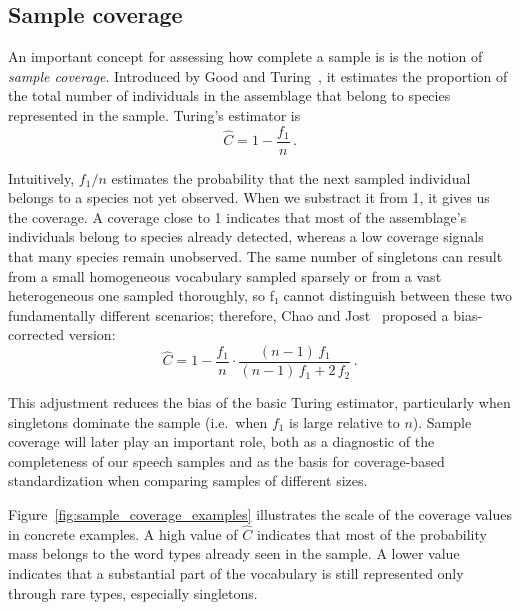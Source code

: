 ﻿\documentclass{article}
\begin{document}
\subsection{Sample coverage}\label{subsec:coverage}
 
An important concept for assessing how complete a sample is is the notion of \emph{sample coverage}. Introduced by Good and Turing~\cite{good1953}, it estimates the proportion of the total number of individuals in the assemblage that belong to species represented in the sample. Turing's estimator is
\begin{equation}\label{eq:coverage_turing}
    \hat{C} = 1 - \frac{f_1}{n}\,.
\end{equation}

Intuitively, $f_1/n$ estimates the probability that the next sampled individual belongs to a species not yet observed. When we substract it from 1, it gives us the coverage. A coverage close to 1 indicates that most of the assemblage's individuals belong to species already detected, whereas a low coverage signals that many species remain unobserved. The same number of singletons can result from a small homogeneous vocabulary sampled sparsely or from a vast heterogeneous one sampled thoroughly, so f₁ cannot distinguish between these two fundamentally different scenarios; therefore, Chao and Jost~\cite{chaojost2012} proposed a bias-corrected version:
\begin{equation}\label{eq:coverage_chaojost}
    \hat{C} = 1 - \frac{f_1}{n} \cdot 
    \frac{(n-1)\,f_1}{(n-1)\,f_1 + 2\,f_2}\,.
\end{equation}


This adjustment reduces the bias of the basic Turing estimator, particularly when singletons dominate the sample (i.e.\ when $f_1$ is large relative to $n$). Sample coverage will later play an important role, both as a diagnostic of the completeness of our speech samples and as the basis for coverage-based standardization when comparing samples of different sizes.

\vspace{1em}

Figure~\ref{fig:sample_coverage_examples} illustrates the scale of the coverage values in concrete examples. 
A high value of \(\hat C\) indicates that most of the probability mass belongs to the word types already seen in the sample. 
A lower value indicates that a substantial part of the vocabulary is still represented only through rare types, especially singletons.
\end{document}
